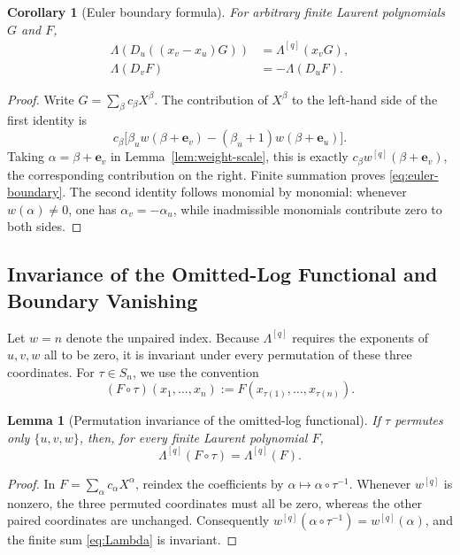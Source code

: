 \documentclass[11pt,a4paper]{article}
\newtheorem{lemma}[theorem]{Lemma}
\newtheorem{corollary}[theorem]{Corollary}
\theoremstyle{definition}
\begin{document}
\begin{corollary}[Euler boundary formula]\label{cor:euler-boundary}
For arbitrary finite Laurent polynomials $G$ and $F$,
\begin{align}
\Lambda\!\left(D_u((x_v-x_u)G)\right)
&=\Lambda^{[q]}(x_vG),\label{eq:euler-boundary}\\
\Lambda(D_vF)&=-\Lambda(D_uF).
\label{eq:paired-euler}
\end{align}
\end{corollary}

\begin{proof}
Write $G=\sum_\beta c_\beta X^\beta$.  The contribution of
$X^\beta$ to the left-hand side of the first identity is
\[
c_\beta\bigl[
\beta_u w(\beta+\bm e_v)
-(\beta_u+1)w(\beta+\bm e_u)
\bigr].
\]
Taking $\alpha=\beta+\bm e_v$ in Lemma~\ref{lem:weight-scale}, this is
exactly $c_\beta w^{[q]}(\beta+\bm e_v)$, the corresponding
contribution on the right.  Finite summation proves
\eqref{eq:euler-boundary}.  The second identity follows monomial by
monomial: whenever $w(\alpha)\ne0$, one has
$\alpha_v=-\alpha_u$, while inadmissible monomials contribute zero to
both sides.
\end{proof}

\subsection{Invariance of the Omitted-Log Functional and Boundary Vanishing}

Let $w=n$ denote the unpaired index.  Because $\Lambda^{[q]}$ requires
the exponents of $u,v,w$ all to be zero, it is invariant under every
permutation of these three coordinates.  For $\tau\in S_n$, we use the
convention
\[
(F\circ\tau)(x_1,\ldots,x_n)
:=F(x_{\tau(1)},\ldots,x_{\tau(n)}).
\]

\begin{lemma}[Permutation invariance of the omitted-log functional]
\label{lem:omitted-invariance}
If $\tau$ permutes only $\{u,v,w\}$, then, for every finite Laurent
polynomial $F$,
\begin{equation}\label{eq:omitted-invariance}
\Lambda^{[q]}(F\circ\tau)=\Lambda^{[q]}(F).
\end{equation}
\end{lemma}

\begin{proof}
In $F=\sum_\alpha c_\alpha X^\alpha$, reindex the coefficients by
$\alpha\mapsto\alpha\circ\tau^{-1}$.  Whenever $w^{[q]}$ is nonzero,
the three permuted coordinates must all be zero, whereas the other
paired coordinates are unchanged.  Consequently
$w^{[q]}(\alpha\circ\tau^{-1})=w^{[q]}(\alpha)$, and the finite sum
\eqref{eq:Lambda} is invariant.
\end{proof}
\end{document}
